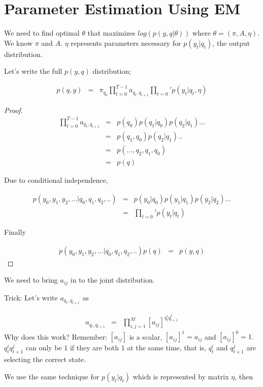 \section{Parameter Estimation Using EM}

We need to find optimal $\theta$ that maximizes $log (p(y,q|\theta))$ where
$\theta = (\pi,A,\eta)$. We know $\pi$ and $A$. $\eta$ represents parameters
necessary for $p(y_t|q_t)$, the output distribution.

Let's write the full $p(y,q)$ distribution;

\begin{eqnarray*}
p(q,y) &=& \pi_{q_0} \prod_{t=0}^{T-1} a_{q_t,q_{t+1}} \prod_{t=0}' p(y_t|q_t,\eta)
\end{eqnarray*}


\begin{proof}
\begin{eqnarray*}
\prod_{t=0}^{T-1} a_{q_t,q_{t+1}} &=& p(q_0)p(q_1|q_0)p(q_2|q_1)...\\
&=& p(q_1,q_0)p(q_2|q_1)..\\
&=& p(...,q_2,q_1,q_0) \\
&=& p(q)
\end{eqnarray*}

Due to conditional independence,

\begin{eqnarray*}
p(y_0,y_1,y_2,...|q_0,q_1,q_2,..) &=& p(y_0|q_0)p(y_1|q_1)p(y_2|q_2)...\\
&=& \prod_{t=0}' p(y_t|q_t)
\end{eqnarray*}

Finally

\begin{eqnarray*}
p(y_0,y_1,y_2,...|q_0,q_1,q_2,..)p(q)  &=& p(y,q)
\end{eqnarray*}
\end{proof}

We need to bring $a_{ij}$ in to the joint distribution.

Trick: Let's write $a_{q_t,q_{t+1}}$ as

\begin{eqnarray*}
a_{q_t,q_{t+1}} &=& \prod_{i,j=1}^M[a_{ij}]^{q_t^i q_{t+1}^j}
\end{eqnarray*}
Why does this work? Remember: $[a_{ij}]$ is a scalar, $[a_{ij}]^1 = a_{ij}$ and
$[a_{ij}]^0 = 1$. $q_t^i q_{t+1}^j$ can only be $1$ if they are both $1$ at the
same time, that is, $q_t^i$ and $q_{t+1}^j$ are selecting the correct state.

We use the same technique for $p(y_t|q_t)$ which is represented by matrix
$\eta$, then

